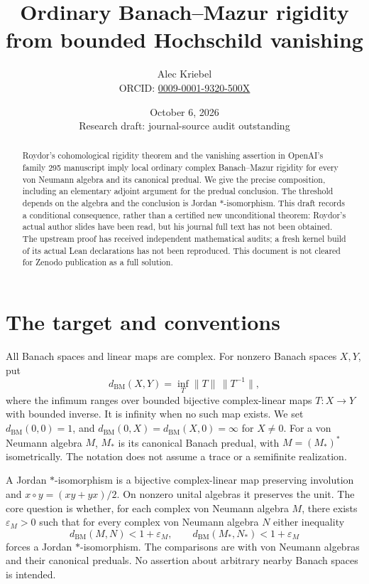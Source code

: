 \documentclass[11pt]{article}
\title{Ordinary Banach--Mazur rigidity from bounded Hochschild vanishing}
\author{Alec Kriebel\\\small ORCID: \href{https://orcid.org/0009-0001-9320-500X}{0009-0001-9320-500X}}
\date{October 6, 2026\\\small Research draft: journal-source audit outstanding}
\newcommand{\BM}{d_{\mathrm{BM}}}
\begin{document}
\maketitle
\begin{abstract}
Roydor's cohomological rigidity theorem and the vanishing assertion in
OpenAI's family 295 manuscript imply local ordinary complex
Banach--Mazur rigidity for every von Neumann algebra and its canonical
predual. We give the precise composition, including an elementary
adjoint argument for the predual conclusion. The threshold depends on
the algebra and the conclusion is Jordan $*$-isomorphism. This draft
records a conditional consequence, rather than a certified new
unconditional theorem: Roydor's actual author slides have been read,
but his journal full text has not been obtained. The upstream proof
has received independent mathematical audits; a fresh kernel build
of its actual Lean declarations has not been reproduced. This
document is not cleared for Zenodo publication as a full solution.
\end{abstract}

\section{The target and conventions}

All Banach spaces and linear maps are complex. For nonzero Banach
spaces $X,Y$, put
\[
 \BM(X,Y)=\inf_T \|T\|\,\|T^{-1}\|,
\]
where the infimum ranges over bounded bijective complex-linear maps
$T:X\to Y$ with bounded inverse. It is infinity when no such map
exists. We set $\BM(0,0)=1$, and $\BM(0,X)=\BM(X,0)=\infty$ for
$X\ne0$. For a von Neumann algebra $M$, $M_*$ is its canonical
Banach predual, with $M=(M_*)^*$ isometrically. The notation does
not assume a trace or a semifinite realization.

A Jordan $*$-isomorphism is a bijective complex-linear map preserving
involution and $x\circ y=(xy+yx)/2$. On nonzero unital algebras it
preserves the unit. The core question is whether, for each complex
von Neumann algebra $M$, there exists $\varepsilon_M>0$ such that
for every complex von Neumann algebra $N$ either inequality
\begin{equation}\label{eq:targets}
 \BM(M,N)<1+\varepsilon_M,
 \qquad \BM(M_*,N_*)<1+\varepsilon_M
\end{equation}
forces a Jordan $*$-isomorphism. The comparisons are with von Neumann
algebras and their canonical preduals. No assertion about arbitrary
nearby Banach spaces is intended.
\end{document}
